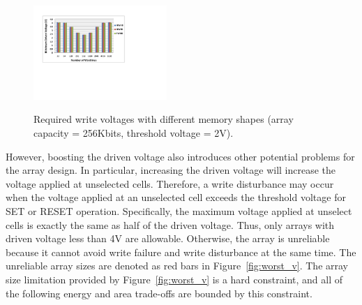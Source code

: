 \begin{figure}%
\centering
  \includegraphics[width=0.45\textwidth]{./figures/shape_f.pdf}\\
  \caption{Required write voltages with different memory shapes (array capacity = 256Kbits, threshold voltage = 2V).}\label{fig:shape}
    \vspace{-15pt}
\end{figure}

However, boosting the driven voltage also introduces other potential
problems for the array design. In particular, increasing the driven
voltage will increase the voltage applied at unselected cells. Therefore,
a write disturbance may occur when the voltage applied at an unselected
cell exceeds the threshold voltage for SET or RESET operation.
Specifically, the maximum voltage applied at unselect cells is exactly the
same as half of the driven voltage. Thus, only arrays with driven voltage
less than 4V are allowable. Otherwise, the array is unreliable because it
cannot avoid write failure and write disturbance at the same time. The
unreliable array sizes are denoted as red bars in
Figure~\ref{fig:worst_v}. The array size limitation provided by
Figure~\ref{fig:worst_v} is a hard constraint, and all of the following
energy and area trade-offs are bounded by this constraint.






